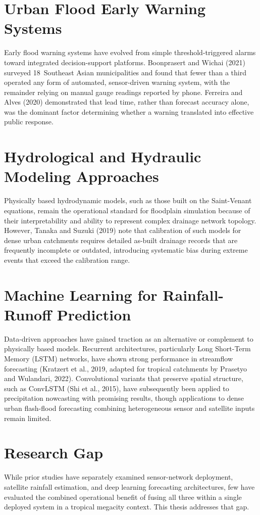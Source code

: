 \documentclass[12pt,a4paper]{report}
\begin{document}
\section{Urban Flood Early Warning Systems}
Early flood warning systems have evolved from simple threshold-triggered alarms toward integrated decision-support platforms. Boonprasert and Wichai (2021) surveyed 18~Southeast Asian municipalities and found that fewer than a third operated any form of automated, sensor-driven warning system, with the remainder relying on manual gauge readings reported by phone. Ferreira and Alves (2020) demonstrated that lead time, rather than forecast accuracy alone, was the dominant factor determining whether a warning translated into effective public response.

\section{Hydrological and Hydraulic Modeling Approaches}
Physically based hydrodynamic models, such as those built on the Saint-Venant equations, remain the operational standard for floodplain simulation because of their interpretability and ability to represent complex drainage network topology. However, Tanaka and Suzuki (2019) note that calibration of such models for dense urban catchments requires detailed as-built drainage records that are frequently incomplete or outdated, introducing systematic bias during extreme events that exceed the calibration range.

\section{Machine Learning for Rainfall-Runoff Prediction}
Data-driven approaches have gained traction as an alternative or complement to physically based models. Recurrent architectures, particularly Long Short-Term Memory (LSTM) networks, have shown strong performance in streamflow forecasting (Kratzert et al., 2019, adapted for tropical catchments by Prasetyo and Wulandari, 2022). Convolutional variants that preserve spatial structure, such as ConvLSTM (Shi et al., 2015), have subsequently been applied to precipitation nowcasting with promising results, though applications to dense urban flash-flood forecasting combining heterogeneous sensor and satellite inputs remain limited.

\section{Research Gap}
While prior studies have separately examined sensor-network deployment, satellite rainfall estimation, and deep learning forecasting architectures, few have evaluated the combined operational benefit of fusing all three within a single deployed system in a tropical megacity context. This thesis addresses that gap.
\end{document}
